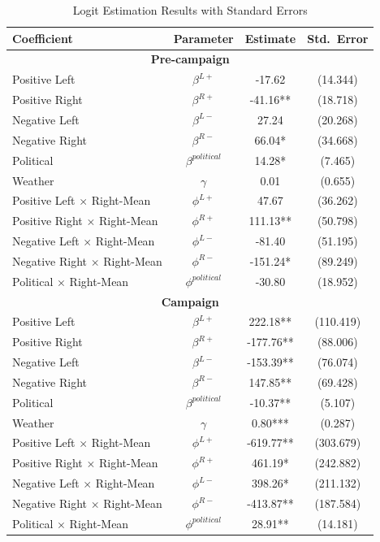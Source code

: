 \documentclass[12pt]{article}
\begin{document}
\begin{table}[!htb]
\caption{Logit Estimation Results with Standard Errors}
\label{tab:logit}
\centering
\begin{threeparttable}
	\begin{tabular}{lccc}
		\hline
		\textbf{Coefficient} & \textbf{Parameter} & \textbf{Estimate} & \textbf{Std.\ Error} \\
		\hline
		\hline
		\multicolumn{4}{c}{\textbf{Pre-campaign}} \\
		\hline
		Positive Left & $\beta^{L+}$ & -17.62 & (14.344) \\
		Positive Right & $\beta^{R+}$ & -41.16** & (18.718) \\
		Negative Left & $\beta^{L-}$ & 27.24 & (20.268) \\
		Negative Right & $\beta^{R-}$ & 66.04* & (34.668) \\
		Political & $\beta^{political}$ & 14.28* & (7.465) \\
		Weather & $\gamma$ & 0.01 & (0.655) \\
		Positive Left $\times$ Right-Mean & $\phi^{L+}$ & 47.67 & (36.262) \\
		Positive Right $\times$ Right-Mean & $\phi^{R+}$ & 111.13** & (50.798) \\
		Negative Left $\times$ Right-Mean & $\phi^{L-}$ & -81.40 & (51.195) \\
		Negative Right $\times$ Right-Mean & $\phi^{R-}$ & -151.24* & (89.249) \\
		Political $\times$ Right-Mean & $\phi^{political}$ & -30.80 & (18.952) \\
		\hline
		\hline
		\multicolumn{4}{c}{\textbf{Campaign}} \\
		\hline
		Positive Left & $\beta^{L+}$ & 222.18** & (110.419) \\
		Positive Right & $\beta^{R+}$ & -177.76** & (88.006) \\
		Negative Left & $\beta^{L-}$ & -153.39** & (76.074) \\
		Negative Right & $\beta^{R-}$ & 147.85** & (69.428) \\
		Political & $\beta^{political}$ & -10.37** & (5.107) \\
		Weather & $\gamma$ & 0.80*** & (0.287) \\
		Positive Left $\times$ Right-Mean & $\phi^{L+}$ & -619.77** & (303.679) \\
		Positive Right $\times$ Right-Mean & $\phi^{R+}$ & 461.19* & (242.882) \\
		Negative Left $\times$ Right-Mean & $\phi^{L-}$ & 398.26* & (211.132) \\
		Negative Right $\times$ Right-Mean & $\phi^{R-}$ & -413.87** & (187.584) \\
		Political $\times$ Right-Mean & $\phi^{political}$ & 28.91** & (14.181) \\
		\hline
	\end{tabular}
	

\end{threeparttable}
\end{table}
\end{document}
